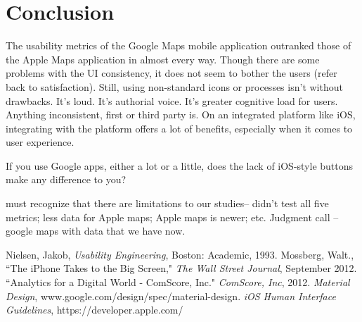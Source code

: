 \documentclass[a4paper; 11pt]{article}
\begin{document}
\section{Conclusion}
The usability metrics of the Google Maps mobile application outranked those of the Apple Maps application in almost every way. Though there are some problems with the UI consistency, it does not seem to bother the users (refer back to satisfaction). Still, using non-standard icons or processes isn't without drawbacks. It's loud. It's authorial voice. It's greater cognitive load for users. Anything inconsistent, first or third party is. On an integrated platform like iOS, integrating with the platform offers a lot of benefits, especially when it comes to user experience.

If you use Google apps, either a lot or a little, does the lack of iOS-style buttons make any difference to you?

must recognize that there are limitations to our studies-- didn't test all five metrics; less data for Apple maps; Apple maps is newer; etc.
Judgment call -- google maps with data that we have now.
\clearpage
\begin{thebibliography}{100} %
 Nielsen, Jakob, \emph{Usability Engineering}, Boston: Academic, 1993.
 Mossberg, Walt., ``The iPhone Takes to the Big Screen," \emph{The Wall Street Journal}, September 2012.
``Analytics for a Digital World - ComScore, Inc." \emph{ComScore, Inc}, 2012.
 \emph{Material Design}, www.google.com/design/spec/material-design.
 \emph{iOS Human Interface Guidelines}, https://developer.apple.com/
\end{thebibliography}
\end{document}
